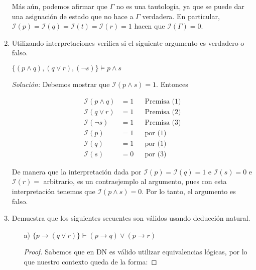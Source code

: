 \documentclass[letterpaper,10pt]{article}
\begin{document}
\begin{enumerate}
        Más aún, podemos afirmar que $\Gamma$ no es una tautología, ya que se 
        puede dar una asignación de estado que no hace a $\Gamma$ verdadera.
        En particular, 
        $\mathcal{I}(p) = \mathcal{I}(q) = \mathcal{I}(t) =\mathcal{I}(r)= 1$ 
        hacen que $\mathcal{I}(\Gamma) = 0$.

        \item Utilizando interpretaciones verifica si el siguiente argumento
        es verdadero o falso.

        \begin{center}
            $\{ (p \land q), (q \lor r), (\neg s) \} \models p \land s$
        \end{center}

        \textit{Solución:} Debemos mostrar que $\mathcal{I}(p \land s) = 1$.
        Entonces

        \begin{align*}
            \mathcal{I}(p \land q) &= 1
            && \text{Premisa (1)} \\
            \mathcal{I}(q \lor r) &= 1
            && \text{Premisa (2)} \\
            \mathcal{I}(\neg s) &= 1 
            && \text{Premisa (3)} \\
            \mathcal{I}(p) &= 1
            && \text{por (1)} \\
            \mathcal{I}(q) &= 1
            && \text{por (1)} \\
            \mathcal{I}(s) &= 0
            && \text{por (3)}
        \end{align*}

        De manera que la interpretación dada por 
        $\mathcal{I}(p) = \mathcal{I}(q) = 1$ e $\mathcal{I}(s) = 0$ e 
        $\mathcal{I}(r) =$ arbitrario, es un contraejemplo al argumento, pues 
        con esta interpretación tenemos que $\mathcal{I}(p \land s) = 0$.
        Por lo tanto, el argumento es falso.

        \item Demuestra que los siguientes secuentes son válidos usando
        deducción natural.

        \begin{itemize}
            \item[a)] $\{ p \rightarrow (q \lor r) \} \vdash
            (p \rightarrow q) \lor (p \rightarrow r)$

            \begin{proof}
                Sabemos que en DN es válido utilizar equivalencias lógicas,
                por lo que nuestro contexto queda de la forma:


\end{proof}
\end{itemize}
\end{enumerate}
\end{document}
